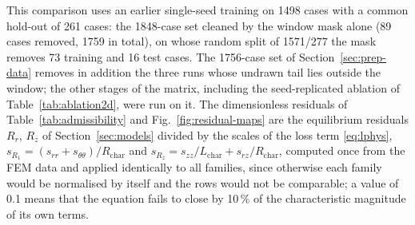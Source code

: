 \documentclass[subscriptcorrection,upint,varvw,barcolor=Goldenrod3,mathalfa=cal=euler,balance,hyphenate,french,pdf-a]{asmejour} %
\begin{document}
This comparison uses an earlier single-seed training on 1498 cases with a common hold-out of 261 cases: the 1848-case set cleaned by the window mask alone (89 cases removed, 1759 in total), on whose random split of 1571/277 the mask removes 73 training and 16 test cases. %
The 1756-case set of Section~\ref{sec:prep-data} removes in addition the three runs whose undrawn tail lies outside the window; the other stages of the matrix, including the seed-replicated ablation of Table~\ref{tab:ablation2d}, were run on it. %
The dimensionless residuals of Table~\ref{tab:admissibility} and Fig.~\ref{fig:residual-maps} are the equilibrium residuals $R_r$, $R_z$ of Section~\ref{sec:models} divided by the scales of the loss term \eqref{eq:lphys}, $s_{R_1}=(s_{rr}+s_{\theta\theta})/R_{\mathrm{char}}$ and $s_{R_z}=s_{zz}/L_{\mathrm{char}}+s_{rz}/R_{\mathrm{char}}$, computed once from the FEM data and applied identically to all families, since otherwise each family would be normalised by itself and the rows would not be comparable; a value of 0.1 means that the equation fails to close by 10\,\% of the characteristic magnitude of its own terms. %
\end{document}
